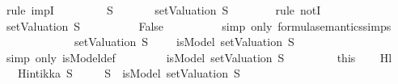 \begin{isabellebody}
\ {\isacharparenleft}rule\ impI{\isacharparenright}\isanewline
\ \ \ \ \isamarkupfalse%
\ {\isachardoublequoteopen}\isactrlbold {\isasymnot}\ {\isasymbottom}\ {\isasymin}\ S{\isachardoublequoteclose}\isanewline
\ \ \ \ \isamarkupfalse%
\ {\isachardoublequoteopen}{\isasymnot}\ {\isacharparenleft}setValuation\ S{\isacharparenright}\ {\isasymTurnstile}\ {\isasymbottom}{\isachardoublequoteclose}\isanewline
\ \ \ \ \isamarkupfalse%
\ {\isacharparenleft}rule\ notI{\isacharparenright}\isanewline
\ \ \ \ \ \isamarkupfalse%
\ {\isachardoublequoteopen}setValuation\ S\ {\isasymTurnstile}\ {\isasymbottom}{\isachardoublequoteclose}\isanewline
\ \ \ \ \ \ \isamarkupfalse%
\ {\isachardoublequoteopen}False{\isachardoublequoteclose}\isanewline
\ \ \ \ \ \ \ \ \isamarkupfalse%
\ {\isacharparenleft}simp\ only{\isacharcolon}\ formula{\isacharunderscore}semantics{\isachardot}simps{\isacharparenleft}{}{\isacharparenright}{\isacharparenright}\isanewline
\ \ \ \ \isamarkupfalse%
\isanewline
\ \ \ \ \isamarkupfalse%
\ \isamarkupfalse%
\ {\isachardoublequoteopen}{\isacharparenleft}{\isasymnot}\ {\isacharparenleft}setValuation\ S{\isacharparenright}\ {\isasymTurnstile}\ {\isasymbottom}{\isacharparenright}\ {\isacharequal}\ {\isacharparenleft}{\isasymnot}\ isModel\ {\isacharparenleft}setValuation\ S{\isacharparenright}\ {\isasymbottom}{\isacharparenright}{\isachardoublequoteclose}\isanewline
\ \ \ \ \ \ \isamarkupfalse%
\ {\isacharparenleft}simp\ only{\isacharcolon}\ isModel{\isacharunderscore}def{\isacharparenright}\isanewline
\ \ \ \ \isamarkupfalse%
\ \isamarkupfalse%
\ {\isachardoublequoteopen}{\isasymnot}\ isModel\ {\isacharparenleft}setValuation\ S{\isacharparenright}\ {\isasymbottom}{\isachardoublequoteclose}\isanewline
\ \ \ \ \ \ \isamarkupfalse%
\ this\isanewline
\ \ \isamarkupfalse%
\isanewline
{}\isamarkupfalse%
%
\endisatagproof
{\isafoldproof}%
%
\isadelimproof
\isanewline
%
\endisadelimproof
\isanewline
{}\isamarkupfalse%
\ Hl{}{\isacharunderscore}{}{\isacharcolon}\isanewline
\ \ \ {\isachardoublequoteopen}Hintikka\ S{\isachardoublequoteclose}\isanewline
\ \ \ {\isachardoublequoteopen}{\isacharparenleft}{\isasymbottom}\ {\isasymin}\ S\ {\isasymlongrightarrow}\ isModel\ {\isacharparenleft}setValuation\ S{\isacharparenright}\ {\isasymbottom}{\isacharparenright}\isanewline

\end{isabellebody}
